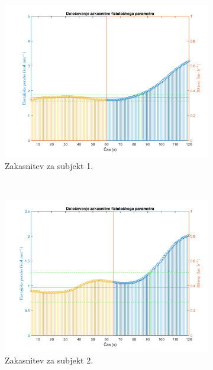 \begin{figure}[htb]
\centering
\begin{subfigure}[t]{0.45\columnwidth}
\includegraphics[width=\columnwidth]{./Slike/lag-estimation-1-eem.png}
\caption{Zakasnitev za subjekt 1.}
\label{fig:lag-estimation-train-eem}
\end{subfigure}
~
\begin{subfigure}[t]{0.45\columnwidth}
\includegraphics[width=\columnwidth]{./Slike/lag-estimation-2-eem.png}
\caption{Zakasnitev za subjekt 2.}
\label{fig:lag-estimation-train-hr}
\end{subfigure}
~
\begin{subfigure}[t]{0.45\columnwidth}

\end{subfigure}
\end{figure}
